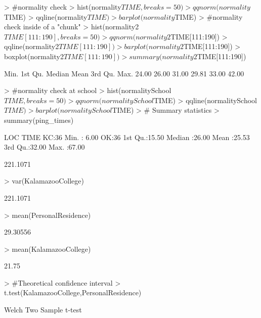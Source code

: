 \documentclass{article}
\begin{document}
\begin{Schunk}
\begin{Sinput}
> #normality check
> hist(normality$TIME,breaks=50)
> qqnorm(normality$TIME)
> qqline(normality$TIME)
> barplot(normality$TIME)
> #normality check inside of a "chunk"
> hist(normality2$TIME[111:190],breaks=50)
> qqnorm(normality2$TIME[111:190])
> qqline(normality2$TIME[111:190])
> barplot(normality2$TIME[111:190])
> boxplot(normality2$TIME[111:190])
> summary(normality2$TIME[111:190])
\end{Sinput}
\begin{Soutput}
   Min. 1st Qu.  Median    Mean 3rd Qu.    Max. 
  24.00   26.00   31.00   29.81   33.00   42.00 
\end{Soutput}
\begin{Sinput}
> #normality check at school
> hist(normalitySchool$TIME,breaks=50)
> qqnorm(normalitySchool$TIME)
> qqline(normalitySchool$TIME)
> barplot(normalitySchool$TIME)
> # Summary statistics
> summary(ping_times)
\end{Sinput}
\begin{Soutput}
 LOC          TIME      
 KC:36   Min.   : 6.00  
 OK:36   1st Qu.:15.50  
         Median :26.00  
         Mean   :25.53  
         3rd Qu.:32.00  
         Max.   :67.00  
\end{Soutput}
\begin{Soutput}
[1] 221.1071
\end{Soutput}
\begin{Sinput}
> var(KalamazooCollege)
\end{Sinput}
\begin{Soutput}
[1] 221.1071
\end{Soutput}
\begin{Sinput}
> mean(PersonalResidence)
\end{Sinput}
\begin{Soutput}
[1] 29.30556
\end{Soutput}
\begin{Sinput}
> mean(KalamazooCollege)
\end{Sinput}
\begin{Soutput}
[1] 21.75
\end{Soutput}
\begin{Sinput}
> #Theoretical confidence interval
> t.test(KalamazooCollege,PersonalResidence)
\end{Sinput}
\begin{Soutput}
	Welch Two Sample t-test


\end{Soutput}
\end{Schunk}
\end{document}
